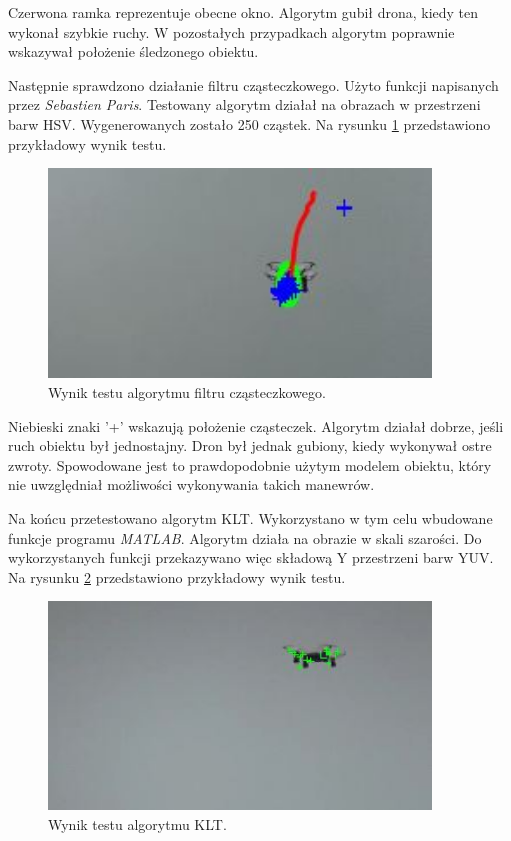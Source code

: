 Czerwona ramka reprezentuje obecne okno. Algorytm gubił drona, kiedy ten wykonał szybkie ruchy. W pozostałych przypadkach algorytm poprawnie wskazywał położenie śledzonego obiektu.

Następnie sprawdzono działanie filtru cząsteczkowego. Użyto funkcji napisanych przez \textit{Sebastien Paris}\cite{Paris}. Testowany algorytm działał na obrazach w przestrzeni barw HSV. Wygenerowanych zostało 250 cząstek. Na rysunku \ref{fig:particle_test} przedstawiono przykładowy wynik testu.

\begin{figure}[h]
	\centering
	\includegraphics[width=4in]{particle_test.jpg}
	\caption{Wynik testu algorytmu filtru cząsteczkowego.}
	\label{fig:particle_test}
\end{figure}

Niebieski znaki '+' wskazują położenie cząsteczek. Algorytm działał dobrze, jeśli ruch obiektu był jednostajny. Dron był jednak gubiony, kiedy wykonywał ostre zwroty. Spowodowane jest to prawdopodobnie użytym modelem obiektu, który nie uwzględniał możliwości wykonywania takich manewrów.

Na końcu przetestowano algorytm KLT. Wykorzystano w tym celu wbudowane funkcje programu \textit{MATLAB}. Algorytm działa na obrazie w skali szarości. Do wykorzystanych funkcji przekazywano więc składową Y przestrzeni barw YUV. Na rysunku \ref{fig:klt_test} przedstawiono przykładowy wynik testu.

\begin{figure}[h]
	\centering
	\includegraphics[width=4in]{klt_test.jpg}
	\caption{Wynik testu algorytmu KLT.}
	\label{fig:klt_test}
\end{figure}

